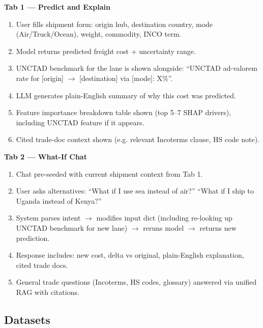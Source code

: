 \documentclass[11pt, a4paper]{article}
\begin{document}
\begin{featurebox}
\textbf{Tab 1 --- Predict and Explain}
\begin{enumerate}[noitemsep]
  \item User fills shipment form: origin hub, destination country, mode (Air/Truck/Ocean), weight, commodity, INCO term.
  \item Model returns predicted freight cost + uncertainty range.
  \item UNCTAD benchmark for the lane is shown alongside: ``UNCTAD ad-valorem rate for [origin] $\rightarrow$ [destination] via [mode]: X\%''.
  \item LLM generates plain-English summary of why this cost was predicted.
  \item Feature importance breakdown table shown (top 5--7 SHAP drivers), including UNCTAD feature if it appears.
  \item Cited trade-doc context shown (e.g. relevant Incoterms clause, HS code note).
\end{enumerate}
\end{featurebox}

\begin{featurebox}
\textbf{Tab 2 --- What-If Chat}
\begin{enumerate}[noitemsep]
  \item Chat pre-seeded with current shipment context from Tab 1.
  \item User asks alternatives: ``What if I use sea instead of air?'' ``What if I ship to Uganda instead of Kenya?''
  \item System parses intent $\rightarrow$ modifies input dict (including re-looking up UNCTAD benchmark for new lane) $\rightarrow$ reruns model $\rightarrow$ returns new prediction.
  \item Response includes: new cost, delta vs original, plain-English explanation, cited trade docs.
  \item General trade questions (Incoterms, HS codes, glossary) answered via unified RAG with citations.
\end{enumerate}
\end{featurebox}

\subsection{Datasets}
\end{document}
